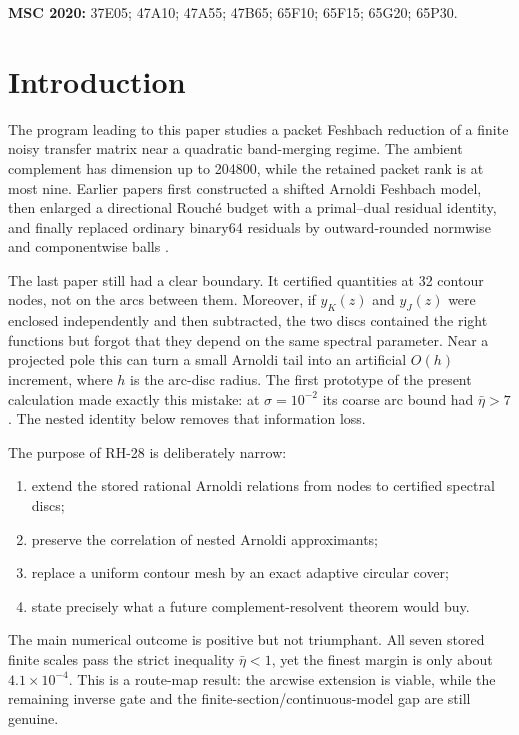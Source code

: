 \documentclass[11pt]{article}
\theoremstyle{definition}
\theoremstyle{remark}
\begin{document}
\medskip
\noindent\textbf{MSC 2020:} 37E05; 47A10; 47A55; 47B65; 65F10; 65F15;
65G20; 65P30.

\section{Introduction}
\label{sec:introduction}

The program leading to this paper studies a packet Feshbach reduction of a
finite noisy transfer matrix near a quadratic band-merging regime.  The
ambient complement has dimension up to 204800, while the retained packet
rank is at most nine.  Earlier papers first constructed a shifted Arnoldi
Feshbach model, then enlarged a directional Rouché budget with a
primal--dual residual identity, and finally replaced ordinary binary64
residuals by outward-rounded normwise and componentwise balls
\citep{WangContourFeshbach2026,WangDirectionalRouche2026,WangPrimalDual2026,WangOutwardCode2026}.

The last paper still had a clear boundary.  It certified quantities at 32
contour nodes, not on the arcs between them.  Moreover, if $y_K(z)$ and
$y_J(z)$ were enclosed independently and then subtracted, the two discs
contained the right functions but forgot that they depend on the same
spectral parameter.  Near a projected pole this can turn a small Arnoldi
tail into an artificial $O(h)$ increment, where $h$ is the arc-disc radius.
The first prototype of the present calculation made exactly this mistake:
at $\sigma=10^{-2}$ its coarse arc bound had $\bar\eta>7$.  The nested
identity below removes that information loss.

The purpose of RH-28 is deliberately narrow:
\begin{enumerate}
 \item extend the stored rational Arnoldi relations from nodes to certified
       spectral discs;
 \item preserve the correlation of nested Arnoldi approximants;
 \item replace a uniform contour mesh by an exact adaptive circular cover;
 \item state precisely what a future complement-resolvent theorem would buy.
\end{enumerate}

The main numerical outcome is positive but not triumphant.  All seven
stored finite scales pass the strict inequality $\bar\eta<1$, yet the
finest margin is only about $4.1\times10^{-4}$.  This is a route-map result:
the arcwise extension is viable, while the remaining inverse gate and the
finite-section/continuous-model gap are still genuine.
\end{document}
